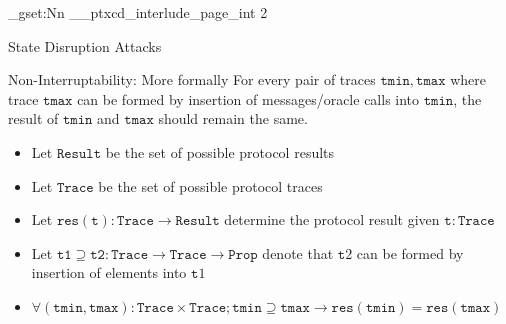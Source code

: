 \ExplSyntaxOn
\int_gset:Nn \g__ptxcd_interlude_page_int {2}
\ExplSyntaxOff


\begin{frame}{State Disruption Attacks}
\end{frame}

\begin{frame}{Non-Interruptability: More formally}
    For every pair of traces $\mathtt{tmin}, \mathtt{tmax}$ where trace $\mathtt{tmax}$ can be formed by
    insertion of messages/oracle calls into $\mathtt{tmin}$, the result of $\mathtt{tmin}$ and $\mathtt{tmax}$
    should remain the same.

    \begin{itemize}
      \item Let $\mathtt{Result}$ be the set of possible protocol results
      \item Let $\mathtt{Trace}$ be the set of possible protocol traces
      \item Let $\mathtt{res}(\mathtt{t}) : \mathtt{Trace} \to \mathtt{Result}$ determine the protocol result given $\mathtt{t} : \mathtt{Trace}$
      \item Let $\mathtt{t1} \supseteq \mathtt{t2} : \mathtt{Trace} \to \mathtt{Trace} \to \mathtt{Prop}$ denote that $\mathtt{t}2$ can be formed by insertion of elements into $\mathtt{t}1$
      \item $\forall (\mathtt{tmin}, \mathtt{tmax}) : \mathtt{Trace} \times \mathtt{Trace}; \mathtt{tmin} \supseteq \mathtt{tmax} \to \mathtt{res}(\mathtt{tmin}) = \mathtt{res}(\mathtt{tmax})$
    \end{itemize}
\end{frame}

